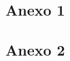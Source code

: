 \subsection{Anexo 1}
\label{sec:anexo1}
\begin{small}
	
\end{small}

\subsection{Anexo 2}
\label{sec:anexo2}
\begin{small}
	
\end{small}

